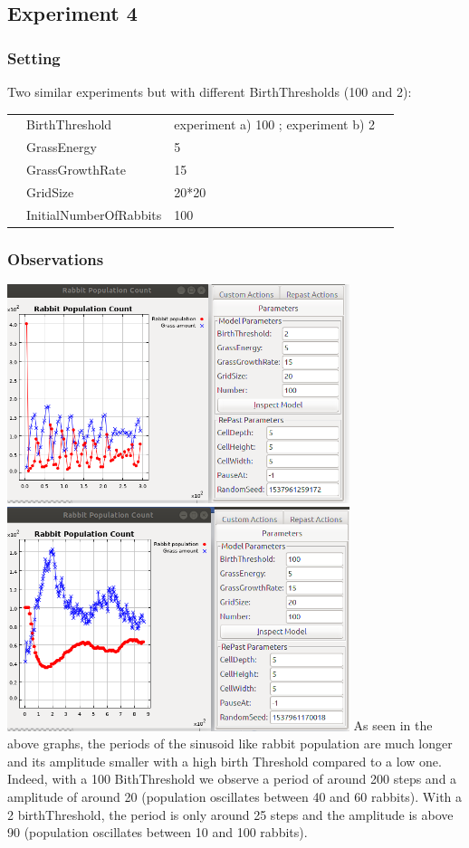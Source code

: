 \documentclass[11pt]{article}
\begin{document}
 \subsection{Experiment 4}
 \subsubsection{Setting}
 Two similar experiments but with different BirthThresholds (100 and 2):
 \begin{table}[H]
  \begin{tabular}{llll}
   &BirthThreshold  &experiment a) 100 ; experiment b) 2\\
   &GrassEnergy  &5\\
   &GrassGrowthRate  &15\\
   &GridSize  &20*20\\
   &InitialNumberOfRabbits  &100
  \end{tabular}
 \end{table}

 \subsubsection{Observations}

 \includegraphics[width=10cm]{fast_sinusoid.png}
 \includegraphics[width=10cm]{slow_sinusoid.png}
 As seen in the above graphs, the periods of the sinusoid like rabbit population are much longer and its amplitude smaller with a high birth Threshold compared to a low one. Indeed, with a 100 BithThreshold we observe a period of around 200 steps and a amplitude of around 20 (population oscillates between 40 and 60 rabbits). With a 2 birthThreshold, the period is only  around 25 steps and the amplitude is above 90 (population oscillates between 10 and 100 rabbits).
\end{document}

